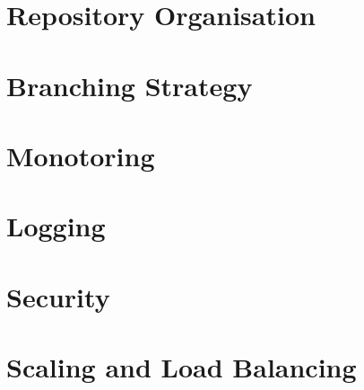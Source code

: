 \section{Repository Organisation}

\section{Branching Strategy}

\section{Monotoring}

\section{Logging}

\section{Security}

\section{Scaling and Load Balancing}